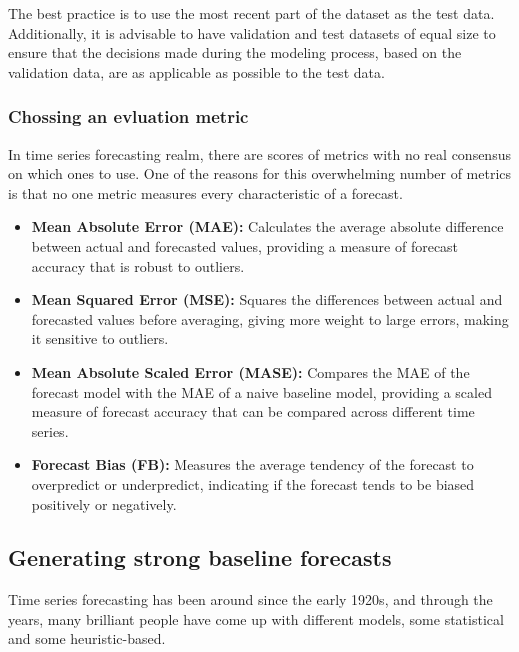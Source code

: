 \documentclass{article}
\begin{document}
The best practice is to use the most recent part of the dataset as the test data. Additionally, it is advisable to have validation and test datasets of equal size to ensure that the decisions made during the modeling process, based on the validation data, are as applicable as possible to the test data.

\subsubsection{Chossing an evluation metric}
In time series forecasting
realm, there are scores of metrics with no real consensus on which ones to use. One of the reasons for
this overwhelming number of metrics is that no one metric measures every characteristic of a forecast.

\begin{itemize}
     \item \textbf{Mean Absolute Error (MAE):} Calculates the average absolute difference between actual and forecasted values, providing a measure of forecast accuracy that is robust to outliers.
    
    \item \textbf{Mean Squared Error (MSE):} Squares the differences between actual and forecasted values before averaging, giving more weight to large errors, making it sensitive to outliers.
    
    \item \textbf{Mean Absolute Scaled Error (MASE):} Compares the MAE of the forecast model with the MAE of a naive baseline model, providing a scaled measure of forecast accuracy that can be compared across different time series.
    
    \item \textbf{Forecast Bias (FB):} Measures the average tendency of the forecast to overpredict or underpredict, indicating if the forecast tends to be biased positively or negatively.

\end{itemize}

\subsection{Generating strong baseline forecasts}
Time series forecasting has been around since the early 1920s, and through the years, many brilliant
people have come up with different models, some statistical and some heuristic-based.
\end{document}
